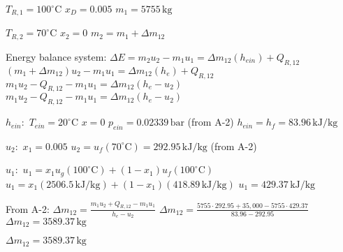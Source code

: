\( T_{R,1} = 100^\circ \text{C} \)  
\( x_D = 0.005 \)  
\( m_1 = 5755 \, \text{kg} \)  

\( T_{R,2} = 70^\circ \text{C} \)  
\( x_2 = 0 \)  
\( m_2 = m_1 + \Delta m_{12} \)  

Energy balance system:  
\( \Delta E = m_2 u_2 - m_1 u_1 = \Delta m_{12} (h_{ein}) + Q_{R,12} \)  
\( (m_1 + \Delta m_{12}) u_2 - m_1 u_1 = \Delta m_{12} (h_e) + Q_{R,12} \)  
\( m_1 u_2 - Q_{R,12} - m_1 u_1 = \Delta m_{12} (h_e - u_2) \)  
\( m_1 u_2 - Q_{R,12} - m_1 u_1 = \Delta m_{12} (h_e - u_2) \)  

\( h_{ein}: \)  
\( T_{ein} = 20^\circ \text{C} \)  
\( x = 0 \)  
\( p_{ein} = 0.02339 \, \text{bar} \) (from A-2)  
\( h_{ein} = h_f = 83.96 \, \text{kJ/kg} \)  

\( u_2: \)  
\( x_1 = 0.005 \)  
\( u_2 = u_f (70^\circ \text{C}) = 292.95 \, \text{kJ/kg} \) (from A-2)  

\( u_1: \)  
\( u_1 = x_1 u_g (100^\circ \text{C}) + (1 - x_1) u_f (100^\circ \text{C}) \)  
\( u_1 = x_1 (2506.5 \, \text{kJ/kg}) + (1 - x_1) (418.89 \, \text{kJ/kg}) \)  
\( u_1 = 429.37 \, \text{kJ/kg} \)  

From A-2:  
\( \Delta m_{12} = \frac{m_1 u_2 + Q_{R,12} - m_1 u_1}{h_e - u_2} \)  
\( \Delta m_{12} = \frac{5755 \cdot 292.95 + 35,000 - 5755 \cdot 429.37}{83.96 - 292.95} \)  
\( \Delta m_{12} = 3589.37 \, \text{kg} \)  

\( \Delta m_{12} = 3589.37 \, \text{kg} \)